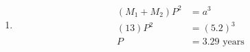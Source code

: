 \documentclass{article}
\begin{document}
\begin{enumerate}
\begin{enumerate}
        \item
        
        \begin{align*}
            (M_1+M_2)P^2 &= a^3\\
            (13)P^2 &= (5.2)^3\\
            P &= 3.29 \text{ years}
        \end{align*}
        
        
    \end{enumerate}
    
\end{enumerate}
\end{document}
